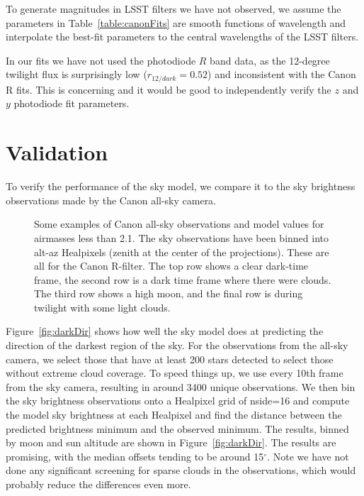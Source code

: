 \documentclass{emulateapj}  %
\newcommand\degree{{^\circ}}
\begin{document}
To generate magnitudes in LSST filters we have not observed, we assume the parameters in Table~\ref{table:canonFits} are smooth functions of wavelength and interpolate the best-fit parameters to the central wavelengths of the LSST filters.

In our fits we have not used the photodiode $R$ band data, as the 12-degree twilight flux is surprisingly low ($r_{12/dark}=0.52$) and inconsistent with the Canon R fits.  This is concerning and it would be good to independently verify the $z$ and $y$ photodiode fit parameters.


\section{Validation}\label{sec:validate}

To verify the performance of the sky model, we compare it to the sky brightness observations made by the Canon all-sky camera.

\begin{figure*}
  \caption{Some examples of Canon all-sky observations and model values for airmasses less than 2.1. The sky observations have been binned into alt-az Healpixels (zenith at the center of the projections). These are all for the Canon R-filter. The top row shows a clear dark-time frame, the second row is a dark time frame where there were clouds. The third row shows a high moon, and the final row is during twilight with some light clouds. \label{fig:skyExamples}}
\end{figure*}



Figure~\ref{fig:darkDir} shows how well the sky model does at predicting the direction of the darkest region of the sky.  For the observations from the all-sky camera, we select those that have at least 200 stars detected to select those without extreme cloud coverage. To speed things up, we use every 10th frame from the sky camera, resulting in around 3400 unique observations.  We then bin the sky brightness observations onto a Healpixel grid of nside=16 and compute the model sky brightness at each Healpixel and find the distance between the predicted brightness minimum and the observed minimum.  The results, binned by moon and sun altitude are shown in Figure~\ref{fig:darkDir}.  The results are promising, with the median offsets tending to be around 15$\degree$.  Note we have not done any significant screening for sparse clouds in the observations, which would probably reduce the differences even more. 
\end{document}

